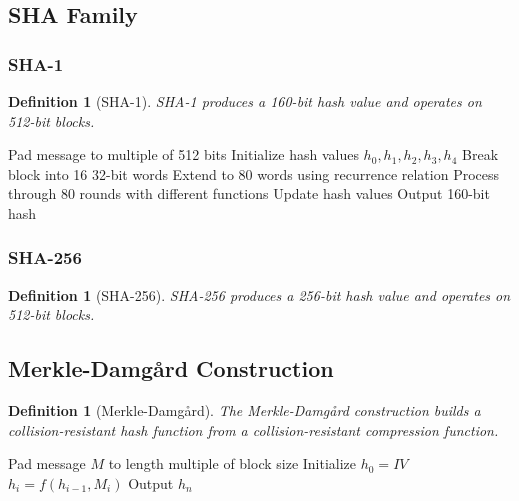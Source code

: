 \documentclass[11pt,a4paper]{article}
\newtheorem{definition}[theorem]{Definition}
\begin{document}
\subsection{SHA Family}

\subsubsection{SHA-1}

\begin{definition}[SHA-1]
SHA-1 produces a 160-bit hash value and operates on 512-bit blocks.
\end{definition}

\begin{algorithm}
\caption{SHA-1 Processing}
\begin{algorithmic}[1]
\STATE Pad message to multiple of 512 bits
\STATE Initialize hash values $h_0, h_1, h_2, h_3, h_4$
    \STATE Break block into 16 32-bit words
    \STATE Extend to 80 words using recurrence relation
    \STATE Process through 80 rounds with different functions
    \STATE Update hash values
\ENDFOR
\STATE Output 160-bit hash
\end{algorithmic}
\end{algorithm}

\subsubsection{SHA-256}

\begin{definition}[SHA-256]
SHA-256 produces a 256-bit hash value and operates on 512-bit blocks.
\end{definition}

\subsection{Merkle-Damgård Construction}

\begin{definition}[Merkle-Damgård]
The Merkle-Damgård construction builds a collision-resistant hash function from a collision-resistant compression function.
\end{definition}

\begin{algorithm}
\caption{Merkle-Damgård Construction}
\begin{algorithmic}[1]
\STATE Pad message $M$ to length multiple of block size
\STATE Initialize $h_0 = IV$
    \STATE $h_i = f(h_{i-1}, M_i)$
\ENDFOR
\STATE Output $h_n$
\end{algorithmic}
\end{algorithm}
\end{document}
